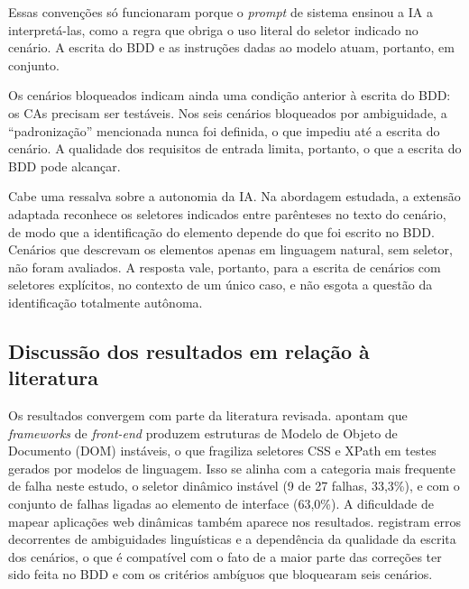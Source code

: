 Essas convenções só funcionaram porque o \textit{prompt} de sistema ensinou a IA a interpretá-las, como a regra que obriga o uso literal do seletor indicado no cenário. A escrita do BDD e as instruções dadas ao modelo atuam, portanto, em conjunto.

Os cenários bloqueados indicam ainda uma condição anterior à escrita do BDD: os CAs precisam ser testáveis. Nos seis cenários bloqueados por ambiguidade, a ``padronização'' mencionada nunca foi definida, o que impediu até a escrita do cenário. A qualidade dos requisitos de entrada limita, portanto, o que a escrita do BDD pode alcançar.

Cabe uma ressalva sobre a autonomia da IA. Na abordagem estudada, a extensão adaptada reconhece os seletores indicados entre parênteses no texto do cenário, de modo que a identificação do elemento depende do que foi escrito no BDD. Cenários que descrevam os elementos apenas em linguagem natural, sem seletor, não foram avaliados. A resposta vale, portanto, para a escrita de cenários com seletores explícitos, no contexto de um único caso, e não esgota a questão da identificação totalmente autônoma.

\subsection{Discussão dos resultados em relação à literatura}
\label{subsec:discussao-literatura}

Os resultados convergem com parte da literatura revisada.  apontam que \textit{frameworks} de \textit{front-end} produzem estruturas de Modelo de Objeto de Documento (DOM) instáveis, o que fragiliza seletores CSS e XPath em testes gerados por modelos de linguagem. Isso se alinha com a categoria mais frequente de falha neste estudo, o seletor dinâmico instável (9 de 27 falhas, 33,3\%), e com o conjunto de falhas ligadas ao elemento de interface (63,0\%). A dificuldade de mapear aplicações web dinâmicas \cite{Mughal2025} também aparece nos resultados.  registram erros decorrentes de ambiguidades linguísticas e a dependência da qualidade da escrita dos cenários, o que é compatível com o fato de a maior parte das correções ter sido feita no BDD e com os critérios ambíguos que bloquearam seis cenários.


